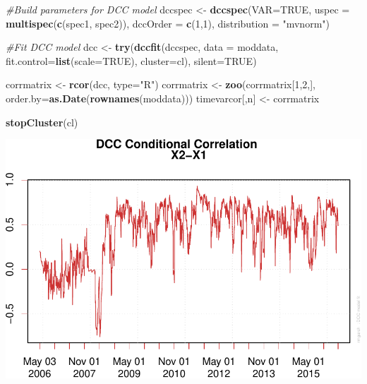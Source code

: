 \documentclass[]{elsarticle} %
\makeatletter
\newenvironment{Shaded}{\begin{snugshade}}{\end{snugshade}}
\newcommand{\KeywordTok}[1]{\textcolor[rgb]{0.13,0.29,0.53}{\textbf{{#1}}}}
\newcommand{\DataTypeTok}[1]{\textcolor[rgb]{0.13,0.29,0.53}{{#1}}}
\newcommand{\DecValTok}[1]{\textcolor[rgb]{0.00,0.00,0.81}{{#1}}}
\newcommand{\StringTok}[1]{\textcolor[rgb]{0.31,0.60,0.02}{{#1}}}
\newcommand{\CommentTok}[1]{\textcolor[rgb]{0.56,0.35,0.01}{\textit{{#1}}}}
\newcommand{\OtherTok}[1]{\textcolor[rgb]{0.56,0.35,0.01}{{#1}}}
\newcommand{\NormalTok}[1]{{#1}}
\def\maxwidth{\ifdim\Gin@nat@width>\linewidth\linewidth
\else\Gin@nat@width\fi}
\let\Oldincludegraphics\includegraphics
\renewcommand{\includegraphics}[1]{\Oldincludegraphics[width=\maxwidth]{#1}}
\makeatother
\begin{document}
\begin{Shaded}
\begin{Highlighting}[]
\CommentTok{#Build parameters for DCC model }
\NormalTok{dccspec <-}\StringTok{ }\KeywordTok{dccspec}\NormalTok{(}\DataTypeTok{VAR=}\OtherTok{TRUE}\NormalTok{, }\DataTypeTok{uspec =} \KeywordTok{multispec}\NormalTok{(}\KeywordTok{c}\NormalTok{(spec1, spec2)), }\DataTypeTok{dccOrder =} \KeywordTok{c}\NormalTok{(}\DecValTok{1}\NormalTok{,}\DecValTok{1}\NormalTok{), }
                   \DataTypeTok{distribution =} \StringTok{"mvnorm"}\NormalTok{)}

\CommentTok{#Fit DCC model}
\NormalTok{dcc <-}\StringTok{ }\KeywordTok{try}\NormalTok{(}\KeywordTok{dccfit}\NormalTok{(dccspec, }\DataTypeTok{data =} \NormalTok{moddata, }\DataTypeTok{fit.control=}\KeywordTok{list}\NormalTok{(}\DataTypeTok{scale=}\OtherTok{TRUE}\NormalTok{), }\DataTypeTok{cluster=}\NormalTok{cl), }
           \DataTypeTok{silent=}\OtherTok{TRUE}\NormalTok{)}

\NormalTok{corrmatrix <-}\StringTok{ }\KeywordTok{rcor}\NormalTok{(dcc, }\DataTypeTok{type=}\StringTok{"R"}\NormalTok{)}
\NormalTok{corrmatrix <-}\StringTok{ }\KeywordTok{zoo}\NormalTok{(corrmatrix[}\DecValTok{1}\NormalTok{,}\DecValTok{2}\NormalTok{,], }\DataTypeTok{order.by=}\KeywordTok{as.Date}\NormalTok{(}\KeywordTok{rownames}\NormalTok{(moddata)))}
\NormalTok{timevarcor[,n] <-}\StringTok{ }\NormalTok{corrmatrix}

\KeywordTok{stopCluster}\NormalTok{(cl) }
\end{Highlighting}
\end{Shaded}

\begin{center}\includegraphics{report_files/figure-latex/analysis232011-1} \end{center}
\end{document}

